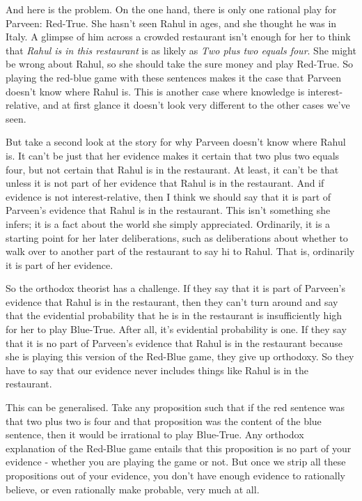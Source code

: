 \documentclass[11pt,]{book}
\begin{document}
And here is the problem. On the one hand, there is only one rational play for Parveen: Red-True. She hasn't seen Rahul in ages, and she thought he was in Italy. A glimpse of him across a crowded restaurant isn't enough for her to think that \emph{Rahul is in this restaurant} is as likely as \emph{Two plus two equals four}. She might be wrong about Rahul, so she should take the sure money and play Red-True. So playing the red-blue game with these sentences makes it the case that Parveen doesn't know where Rahul is. This is another case where knowledge is interest-relative, and at first glance it doesn't look very different to the other cases we've seen.

But take a second look at the story for why Parveen doesn't know where Rahul is. It can't be just that her evidence makes it certain that two plus two equals four, but not certain that Rahul is in the restaurant. At least, it can't be that unless it is not part of her evidence that Rahul is in the restaurant. And if evidence is not interest-relative, then I think we should say that it is part of Parveen's evidence that Rahul is in the restaurant. This isn't something she infers; it is a fact about the world she simply appreciated. Ordinarily, it is a starting point for her later deliberations, such as deliberations about whether to walk over to another part of the restaurant to say hi to Rahul. That is, ordinarily it is part of her evidence.

So the orthodox theorist has a challenge. If they say that it is part of Parveen's evidence that Rahul is in the restaurant, then they can't turn around and say that the evidential probability that he is in the restaurant is insufficiently high for her to play Blue-True. After all, it's evidential probability is one. If they say that it is no part of Parveen's evidence that Rahul is in the restaurant because she is playing this version of the Red-Blue game, they give up orthodoxy. So they have to say that our evidence never includes things like Rahul is in the restaurant.

This can be generalised. Take any proposition such that if the red sentence was that two plus two is four and that proposition was the content of the blue sentence, then it would be irrational to play Blue-True. Any orthodox explanation of the Red-Blue game entails that this proposition is no part of your evidence - whether you are playing the game or not. But once we strip all these propositions out of your evidence, you don't have enough evidence to rationally believe, or even rationally make probable, very much at all.
\end{document}
